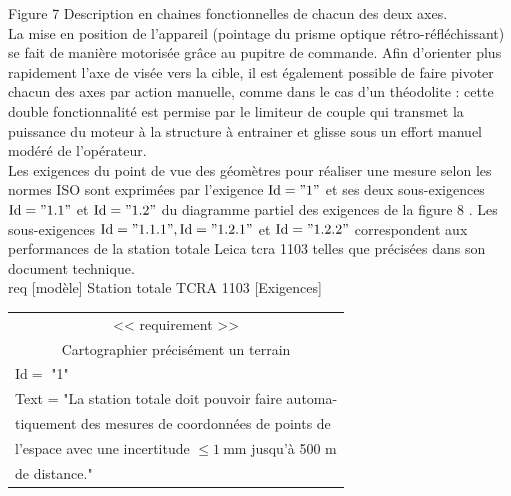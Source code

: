 \documentclass[10pt]{article}
\begin{document}
Figure 7 Description en chaines fonctionnelles de chacun des deux axes.\\
La mise en position de l'appareil (pointage du prisme optique rétro-réfléchissant) se fait de manière motorisée grâce au pupitre de commande. Afin d'orienter plus rapidement l'axe de visée vers la cible, il est également possible de faire pivoter chacun des axes par action manuelle, comme dans le cas d'un théodolite : cette double fonctionnalité est permise par le limiteur de couple qui transmet la puissance du moteur à la structure à entrainer et glisse sous un effort manuel modéré de l'opérateur.\\
Les exigences du point de vue des géomètres pour réaliser une mesure selon les normes ISO sont exprimées par l'exigence $\mathrm{Id}=" 1 "$ et ses deux sous-exigences $\mathrm{Id}=" 1.1 "$ et $\mathrm{Id}=" 1.2 "$ du diagramme partiel des exigences de la figure 8 . Les sous-exigences $\mathrm{Id}=" 1.1 .1 ", \mathrm{Id}=" 1.2 .1 "$ et $\mathrm{Id}=" 1.2 .2 "$ correspondent aux performances de la station totale Leica tcra 1103 telles que précisées dans son document technique.\\[0pt]
req [modèle] Station totale TCRA 1103 [Exigences]

\begin{center}
\begin{tabular}{|l|}
\hline
\multicolumn{1}{|c|}{<< requirement >>} \\
\multicolumn{1}{c|}{Cartographier précisément un terrain} \\
\hline
$\mathrm{Id}=$ "1" \\
Text = "La station totale doit pouvoir faire automa- \\
tiquement des mesures de coordonnées de points de \\
l'espace avec une incertitude $\leqslant 1 \mathrm{~mm}$ jusqu'à 500 m \\
de distance." \\
\end{tabular}
\end{center}
\end{document}
